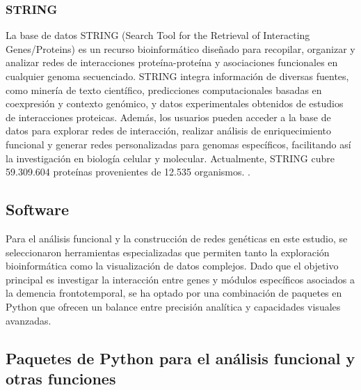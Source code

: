 \subsubsection*{STRING}
La base de datos STRING (Search Tool for the Retrieval of Interacting Genes/Proteins) es un recurso bioinformático diseñado para recopilar, organizar y analizar redes de interacciones proteína-proteína y asociaciones funcionales en cualquier genoma secuenciado. STRING integra información de diversas fuentes, como minería de texto científico, predicciones computacionales basadas en coexpresión y contexto genómico, y datos experimentales obtenidos de estudios de interacciones proteicas. Además, los usuarios pueden acceder a la base de datos para explorar redes de interacción, realizar análisis de enriquecimiento funcional y generar redes personalizadas para genomas específicos, facilitando así la investigación en biología celular y molecular. Actualmente, STRING cubre 59.309.604 proteínas provenientes de 12.535 organismos.  \cite{szklarczyk2023stringdb}.

\subsection{Software}

Para el análisis funcional y la construcción de redes genéticas en este estudio, se seleccionaron herramientas especializadas que permiten tanto la exploración bioinformática como la visualización de datos complejos. Dado que el objetivo principal es investigar la interacción entre genes y módulos específicos asociados a la demencia frontotemporal, se ha optado por una combinación de paquetes en Python que ofrecen un balance entre precisión analítica y capacidades visuales avanzadas.

\subsection*{Paquetes de Python para el análisis funcional y otras funciones}

